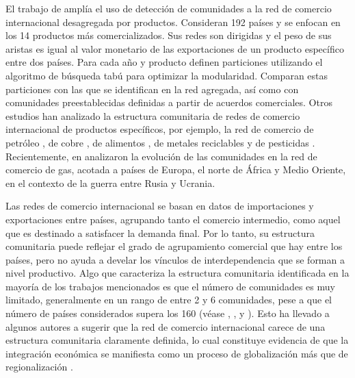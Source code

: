 El trabajo de \textcite{Barigozzi2011} amplía el uso de detección de comunidades a la red de comercio internacional desagregada por productos. Consideran 192 países y se enfocan en los 14 productos más comercializados. Sus redes son dirigidas y el peso de sus aristas es igual al valor monetario de las exportaciones de un producto específico entre dos países. Para cada año y producto definen particiones utilizando el algoritmo de búsqueda tabú para optimizar la modularidad. Comparan estas particiones con las que se identifican en la red agregada, así como con comunidades preestablecidas definidas a partir de acuerdos comerciales. %
Otros estudios han analizado la estructura comunitaria de redes de comercio internacional de productos específicos, por ejemplo, la red de comercio de petróleo \parencite{Zhong2014}, de cobre \parencite{Dong2018}, de alimentos \parencite{Torreggiani2018}, de metales reciclables \parencite{Hu2020} y de pesticidas \parencite{Li2023}. Recientemente, en  \textcite{Tsekeris2025} analizaron la evolución de las comunidades en la red de comercio de gas, acotada a países de Europa, el norte de África y Medio Oriente, en el contexto de la guerra entre Rusia y Ucrania.

Las redes de comercio internacional se basan en datos de importaciones y exportaciones entre países, agrupando tanto el comercio intermedio, como aquel que es destinado a satisfacer la demanda final. Por lo tanto, su estructura comunitaria puede reflejar el grado de agrupamiento comercial que hay entre los países, pero no ayuda a develar los vínculos de interdependencia que se forman a nivel productivo. Algo que caracteriza la estructura comunitaria identificada en la mayoría de los trabajos mencionados es que el número de comunidades es muy limitado, generalmente en un rango de entre 2 y 6 comunidades, pese a que el número de países considerados supera los 160 (véase \textcite[p.~2058]{Barigozzi2011}, \textcite[p.~3]{Piccardi2012}, \textcite[p.~73]{Fan2014} y \textcite[p.~3]{Zhu2014}). %
Esto ha llevado a algunos autores a sugerir que la red de comercio internacional carece de una estructura comunitaria claramente definida, lo cual constituye evidencia de que la integración económica se manifiesta como un proceso de globalización más que de regionalización \parencite[pp.~10--11]{Piccardi2012}.

